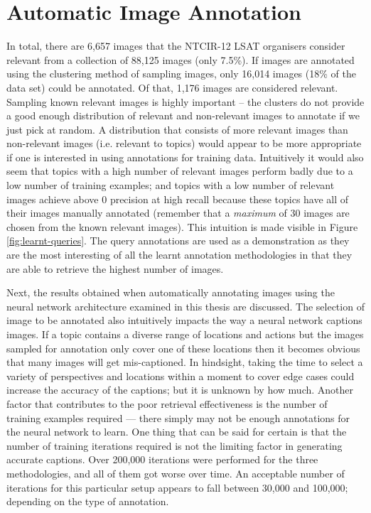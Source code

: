 \section{Automatic Image Annotation}

In total, there are 6,657 images that the NTCIR-12 LSAT organisers consider relevant from a collection of 88,125 images (only 7.5\%). If images are annotated using the clustering method of sampling images, only 16,014 images (18\% of the data set) could be annotated. Of that, 1,176 images are considered relevant. Sampling known relevant images is highly important -- the clusters do not provide a good enough distribution of relevant and non-relevant images to annotate if we just pick at random. A distribution that consists of more relevant images than non-relevant images (i.e. relevant to topics) would appear to be more appropriate if one is interested in using annotations for training data. Intuitively it would also seem that topics with a high number of relevant images perform badly due to a low number of training examples; and topics with a low number of relevant images achieve above $0$ precision at high recall because these topics have all of their images manually annotated (remember that a \textit{maximum} of $30$ images are chosen from the known relevant images). This intuition is made visible in Figure \ref{fig:learnt-queries}. The query annotations are used as a demonstration as they are the most interesting of all the learnt annotation methodologies in that they are able to retrieve the highest number of images.


Next, the results obtained when automatically annotating images using the neural network architecture examined in this thesis are discussed. The selection of image to be annotated also intuitively impacts the way a neural network captions images. If a topic contains a diverse range of locations and actions but the images sampled for annotation only cover one of these locations then it becomes obvious that many images will get mis-captioned. In hindsight, taking the time to select a variety of perspectives and locations within a moment to cover edge cases could increase the accuracy of the captions; but it is unknown by how much. Another factor that contributes to the poor retrieval effectiveness is the number of training examples required --- there simply may not be enough annotations for the neural network to learn. One thing that can be said for certain is that the number of training iterations required is not the limiting factor in generating accurate captions. Over 200,000 iterations were performed for the three methodologies, and all of them got worse over time. An acceptable number of iterations for this particular setup appears to fall between 30,000 and 100,000; depending on the type of annotation.


